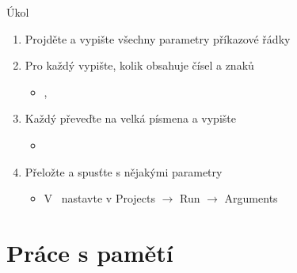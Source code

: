 \begin{frame}{Úkol}

  \begin{enumerate}
    \item Projděte a vypište všechny parametry příkazové řádky
    \item Pro každý vypište, kolik obsahuje čísel a znaků
    \begin{itemize}
      \item {}, 
    \end{itemize}

    \item Každý převeďte na velká písmena a vypište
    \begin{itemize}
      \item {}
    \end{itemize}

    \item Přeložte a spusťte s nějakými parametry
    \begin{itemize}
      \item V \qtcu\ nastavte v Projects $\rightarrow$ Run $\rightarrow$
	Arguments
    \end{itemize}
  \end{enumerate}

\end{frame}


\section{Práce s pamětí}
\frame{\sectionpage}

\heapemphtrue





%
%

